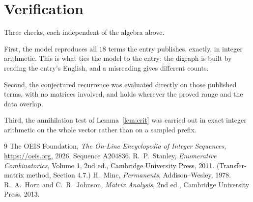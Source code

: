 \documentclass[11pt,a4paper]{article}
\theoremstyle{plain}
\theoremstyle{definition}
\begin{document}
\section{Verification}

Three checks, each independent of the algebra above.

First, the model reproduces all $18$ terms the entry publishes, exactly, in integer
arithmetic. This is what ties the model to the entry: the digraph is built by reading the
entry's English, and a misreading gives different counts.

Second, the conjectured recurrence was evaluated directly on those published terms, with no
matrices involved, and holds wherever the proved range and the data overlap.

Third, the annihilation test of Lemma~\ref{lem:crit} was carried out in exact integer
arithmetic on the whole vector rather than on a sampled prefix.

\begin{thebibliography}{9}
 The OEIS Foundation, \emph{The On-Line Encyclopedia of Integer
Sequences}, \url{https://oeis.org}, 2026. Sequence A204836.
 R.~P.~Stanley, \emph{Enumerative Combinatorics}, Volume 1, 2nd ed.,
Cambridge University Press, 2011. (Transfer-matrix method, Section 4.7.)
 H.~Minc, \emph{Permanents}, Addison--Wesley, 1978.
 R.~A.~Horn and C.~R.~Johnson, \emph{Matrix Analysis}, 2nd ed., Cambridge
University Press, 2013.
\end{thebibliography}
\end{document}
